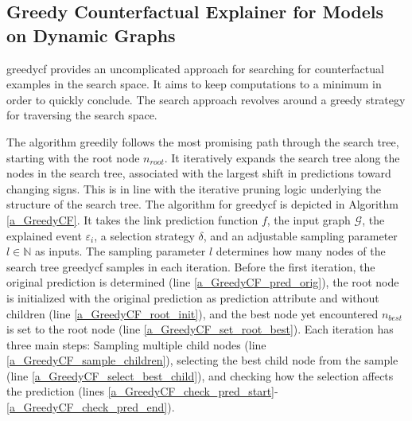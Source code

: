 \subsection{Greedy Counterfactual Explainer for Models on Dynamic Graphs}
\label{s_Methodology_GreedyCF}

\acrfull{greedycf} provides an uncomplicated approach for searching for counterfactual examples in the search space. It aims to keep computations to a minimum in order to quickly conclude. The search approach revolves around a greedy strategy for traversing the search space.

The algorithm greedily follows the most promising path through the search tree, starting with the root node $n_{root}$. It iteratively expands the search tree along the nodes in the search tree, associated with the largest shift in predictions toward changing signs. This is in line with the iterative pruning logic underlying the structure of the search tree. The algorithm for \gls{greedycf} is depicted in Algorithm \ref{a_GreedyCF}. It takes the link prediction function $f$, the input graph $\mathcal{G}$, the explained event $\varepsilon_i$, a selection strategy $\delta$, and an adjustable sampling parameter $l \in \mathbb{N}$ as inputs. The sampling parameter $l$ determines how many nodes of the search tree \gls{greedycf} samples in each iteration. Before the first iteration, the original prediction is determined (line \ref{a_GreedyCF_pred_orig}), the root node is initialized with the original prediction as prediction attribute and without children (line \ref{a_GreedyCF_root_init}), and the best node yet encountered $n_{best}$ is set to the root node (line \ref{a_GreedyCF_set_root_best}). Each iteration has three main steps: Sampling multiple child nodes (line \ref{a_GreedyCF_sample_children}), selecting the best child node from the sample (line \ref{a_GreedyCF_select_best_child}), and checking how the selection affects the prediction (lines \ref{a_GreedyCF_check_pred_start}-\ref{a_GreedyCF_check_pred_end}). 


